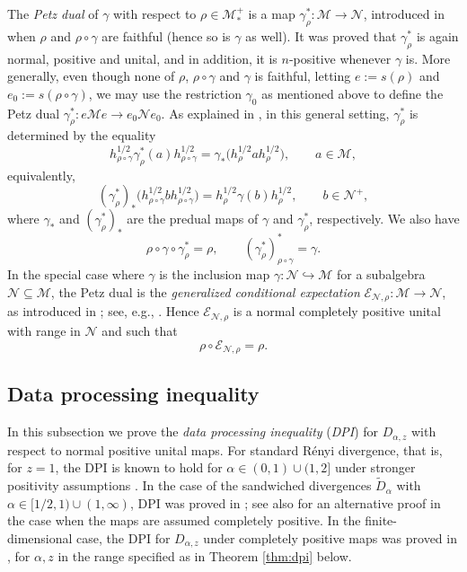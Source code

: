 \documentclass[12pt]{article}
\theoremstyle{definition}
\theoremstyle{remark}
\numberwithin{equation}{section}
\def\cE{\mathcal E}
\def\Me{\mathcal M}
\def\Ne{\mathcal N}
\begin{document}
The \emph{Petz dual} of $\gamma$ with respect to $\rho\in \Me_*^+$ is a map
$\gamma_\rho^*:\Me\to \Ne$, introduced in \cite{petz1988sufficiency} {when $\rho$ and
$\rho\circ\gamma$ are faithful (hence so is $\gamma$ as well).} It was proved that
$\gamma_\rho^*$ is again normal, positive and unital, and in addition, it is $n$-positive whenever
$\gamma$ is. More generally, {even though none of $\rho$, $\rho\circ\gamma$ and
$\gamma$ is faithful, letting $e:=s(\rho)$ and $e_0:=s(\rho\circ\gamma)$,} we may use the restriction
$\gamma_0$ as mentioned above to define the Petz dual $\gamma^*_\rho: e\Me e\to e_0\Ne e_0$. 
As explained in \cite{jencova2018renyi}, in this general setting, $\gamma^*_\rho$ is determined by
the equality
{
\[
h_{\rho\circ\gamma}^{1/2}\gamma_\rho^*(a)h_{\rho\circ\gamma}^{1/2}
=\gamma_*\bigl(h_\rho^{1/2}ah_\rho^{1/2}\bigr),
\qquad a\in\Me,
\]
equivalently,
\begin{equation}\label{eq:petzdual}
(\gamma^*_\rho)_*\bigl(h_{\rho\circ\gamma}^{1/2}bh_{\rho\circ\gamma}^{1/2}\bigr)
=h_\rho^{1/2}\gamma(b)h_\rho^{1/2},\qquad b\in\Ne^+,
\end{equation}
where $\gamma_*$ and $(\gamma^*_\rho)_*$ are the predual maps of $\gamma$ and $\gamma^*_\rho$,
respectively.}
We also have
\begin{equation}\label{eq:petzdual2}
\rho\circ\gamma\circ\gamma^*_\rho=\rho,\qquad (\gamma_\rho^*)_{\rho\circ\gamma}^*=\gamma.
\end{equation}
In the special case where $\gamma$ is the
inclusion map $\gamma: \Ne\hookrightarrow \Me$ for a subalgebra $\Ne\subseteq \Me$, the Petz dual
is the \emph{generalized conditional expectation} $\cE_{\Ne,\rho}:\Me\to \Ne$, as introduced in
\cite{accardi1982conditional}; see, e.g., \cite[Proposition 6.5]{hiai2021quantum}. Hence 
$\cE_{\Ne,\rho}$ is a normal completely positive unital with range in $\Ne$ and such that 
\[
\rho\circ \cE_{\Ne,\rho}=\rho.
\]


\subsection{Data processing inequality}

In this {subsection} we prove the \emph{data processing inequality} (\emph{DPI}) for
$D_{\alpha,z}$ with respect to normal positive unital maps. For standard R\'enyi divergence, that is,
for $z=1$, {the} DPI is known to hold for $\alpha\in (0,1)\cup (1,2]$ under stronger positivity
assumptions \cite{hiai2018quantum}. In the case of the sandwiched divergences $\tilde D_\alpha$ with
{$\alpha\in[1/2,1)\cup(1,\infty)$,} DPI was proved in \cite{jencova2018renyi,jencova2021renyi};
see also \cite{berta2018renyi} for an alternative proof in the case when the maps are assumed
completely positive. In the finite-dimensional case, {the DPI for $D_{\alpha,z}$ under completely
positive maps was proved in \cite{zhang2020fromwyd}, for $\alpha,z$ in the range specified as
in Theorem \ref{thm:dpi} below.}
\end{document}
